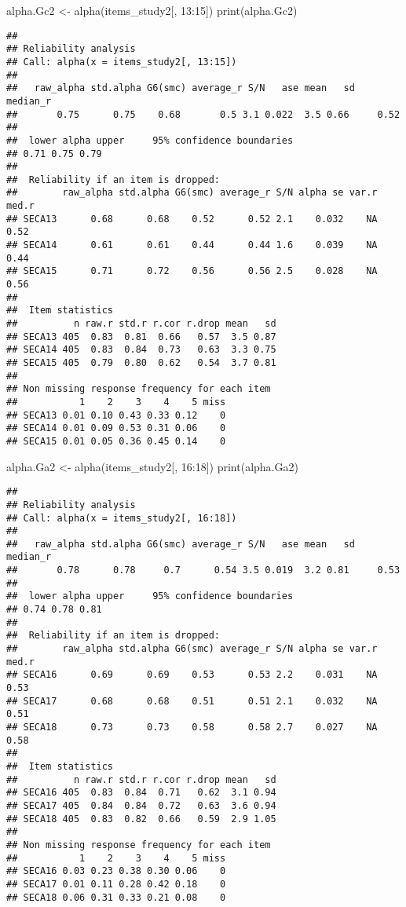 \documentclass[
]{article}
\newenvironment{Shaded}{\begin{snugshade}}{\end{snugshade}}
\newcommand{\DecValTok}[1]{\textcolor[rgb]{0.00,0.00,0.81}{#1}}
\newcommand{\FunctionTok}[1]{\textcolor[rgb]{0.00,0.00,0.00}{#1}}
\newcommand{\NormalTok}[1]{#1}
\newcommand{\OtherTok}[1]{\textcolor[rgb]{0.56,0.35,0.01}{#1}}
\newcommand{\SpecialCharTok}[1]{\textcolor[rgb]{0.00,0.00,0.00}{#1}}
\begin{document}
\begin{Shaded}
\begin{Highlighting}[]
\NormalTok{alpha.Gc2 }\OtherTok{\textless{}{-}} \FunctionTok{alpha}\NormalTok{(items\_study2[, }\DecValTok{13}\SpecialCharTok{:}\DecValTok{15}\NormalTok{])}
\FunctionTok{print}\NormalTok{(alpha.Gc2)}
\end{Highlighting}
\end{Shaded}

\begin{verbatim}
## 
## Reliability analysis   
## Call: alpha(x = items_study2[, 13:15])
## 
##   raw_alpha std.alpha G6(smc) average_r S/N   ase mean   sd median_r
##       0.75      0.75    0.68       0.5 3.1 0.022  3.5 0.66     0.52
## 
##  lower alpha upper     95% confidence boundaries
## 0.71 0.75 0.79 
## 
##  Reliability if an item is dropped:
##        raw_alpha std.alpha G6(smc) average_r S/N alpha se var.r med.r
## SECA13      0.68      0.68    0.52      0.52 2.1    0.032    NA  0.52
## SECA14      0.61      0.61    0.44      0.44 1.6    0.039    NA  0.44
## SECA15      0.71      0.72    0.56      0.56 2.5    0.028    NA  0.56
## 
##  Item statistics 
##          n raw.r std.r r.cor r.drop mean   sd
## SECA13 405  0.83  0.81  0.66   0.57  3.5 0.87
## SECA14 405  0.83  0.84  0.73   0.63  3.3 0.75
## SECA15 405  0.79  0.80  0.62   0.54  3.7 0.81
## 
## Non missing response frequency for each item
##           1    2    3    4    5 miss
## SECA13 0.01 0.10 0.43 0.33 0.12    0
## SECA14 0.01 0.09 0.53 0.31 0.06    0
## SECA15 0.01 0.05 0.36 0.45 0.14    0
\end{verbatim}

\begin{Shaded}
\begin{Highlighting}[]
\NormalTok{alpha.Ga2 }\OtherTok{\textless{}{-}} \FunctionTok{alpha}\NormalTok{(items\_study2[, }\DecValTok{16}\SpecialCharTok{:}\DecValTok{18}\NormalTok{])}
\FunctionTok{print}\NormalTok{(alpha.Ga2)}
\end{Highlighting}
\end{Shaded}

\begin{verbatim}
## 
## Reliability analysis   
## Call: alpha(x = items_study2[, 16:18])
## 
##   raw_alpha std.alpha G6(smc) average_r S/N   ase mean   sd median_r
##       0.78      0.78     0.7      0.54 3.5 0.019  3.2 0.81     0.53
## 
##  lower alpha upper     95% confidence boundaries
## 0.74 0.78 0.81 
## 
##  Reliability if an item is dropped:
##        raw_alpha std.alpha G6(smc) average_r S/N alpha se var.r med.r
## SECA16      0.69      0.69    0.53      0.53 2.2    0.031    NA  0.53
## SECA17      0.68      0.68    0.51      0.51 2.1    0.032    NA  0.51
## SECA18      0.73      0.73    0.58      0.58 2.7    0.027    NA  0.58
## 
##  Item statistics 
##          n raw.r std.r r.cor r.drop mean   sd
## SECA16 405  0.83  0.84  0.71   0.62  3.1 0.94
## SECA17 405  0.84  0.84  0.72   0.63  3.6 0.94
## SECA18 405  0.83  0.82  0.66   0.59  2.9 1.05
## 
## Non missing response frequency for each item
##           1    2    3    4    5 miss
## SECA16 0.03 0.23 0.38 0.30 0.06    0
## SECA17 0.01 0.11 0.28 0.42 0.18    0
## SECA18 0.06 0.31 0.33 0.21 0.08    0
\end{verbatim}
\end{document}
